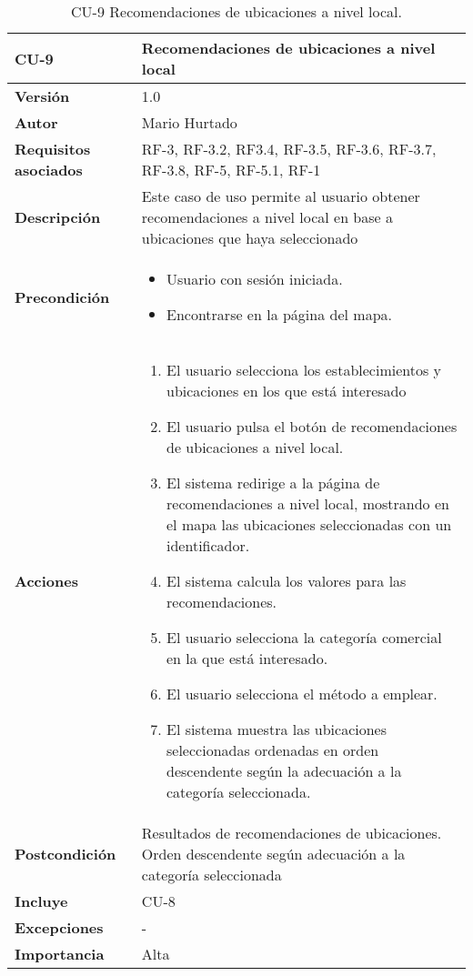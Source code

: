 \begin{table}[p]
	\centering
	\begin{tabularx}{\linewidth}{ p{} p{} }
			\toprule
			\textbf{CU-9}    & \textbf{Recomendaciones de ubicaciones a nivel local}\\
			\toprule
			\textbf{Versión}              & 1.0    \\
			\textbf{Autor}                & Mario Hurtado \\
			\textbf{Requisitos asociados} & RF-3, RF-3.2, RF3.4, RF-3.5, RF-3.6, RF-3.7, RF-3.8, RF-5, RF-5.1, RF-1  \\
			\textbf{Descripción}          & Este caso de uso permite al usuario obtener recomendaciones a nivel local en base a ubicaciones que haya seleccionado\\
			\textbf{Precondición}         & \begin{itemize}
							\tightlist
				\item Usuario con sesión iniciada.
				\item Encontrarse en la página del mapa.
				\end{itemize}\\
			\textbf{Acciones}             &
			\begin{enumerate}
					\def\labelenumi{\arabic{enumi}.}
					\tightlist
					\item El usuario selecciona los establecimientos y ubicaciones en los que está interesado
					\item El usuario pulsa el botón de recomendaciones de ubicaciones a nivel local.
					\item El sistema redirige a la página de recomendaciones a nivel local, mostrando en el mapa las ubicaciones seleccionadas con un identificador.
					\item El sistema calcula los valores para las recomendaciones.
					\item El usuario selecciona la categoría comercial en la que está interesado.
					\item El usuario selecciona el método a emplear.
					\item El sistema muestra las ubicaciones seleccionadas ordenadas en orden descendente según la adecuación a la categoría seleccionada.
				\end{enumerate}\\
			\textbf{Postcondición}        & Resultados de recomendaciones de ubicaciones. Orden descendente según adecuación a la categoría seleccionada\\
			\textbf{Incluye}   & CU-8\\
			\textbf{Excepciones}          & - \\
			\textbf{Importancia}          & Alta  \\
			\bottomrule
		\end{tabularx}
	\caption{CU-9 Recomendaciones de ubicaciones a nivel local.}
\end{table}

